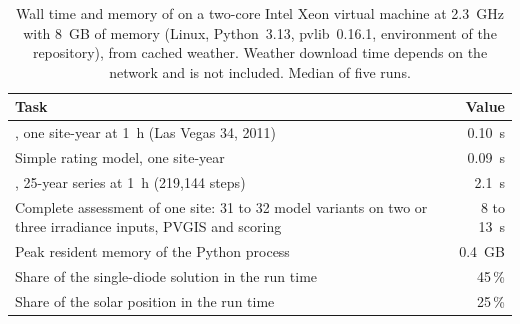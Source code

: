 \documentclass[11pt]{article}
\begin{document}
\begin{table}[htbp]
\centering
\caption{Wall time and memory of \RePV{} on a two-core Intel Xeon virtual machine at 2.3~GHz with 8~GB of memory (Linux, Python~3.13, pvlib~0.16.1, environment of the repository), from cached weather. Weather download time depends on the network and is not included. Median of five runs.}
\label{tab:s_bench}
\small
\begin{tabularx}{\textwidth}{>{\raggedright\arraybackslash}X r}
\toprule
Task & Value \\
\midrule
\RePV{}, one site-year at 1~h (Las Vegas 34, 2011) & 0.10~s \\
Simple rating model, one site-year & 0.09~s \\
\RePV{}, 25-year series at 1~h (219{,}144 steps) & 2.1~s \\
Complete assessment of one site: 31 to 32 model variants on two or three irradiance inputs, PVGIS and scoring & 8 to 13~s \\
Peak resident memory of the Python process & 0.4~GB \\
Share of the single-diode solution in the run time & 45\,\% \\
Share of the solar position in the run time & 25\,\% \\
\bottomrule
\end{tabularx}
\end{table}
\end{document}
